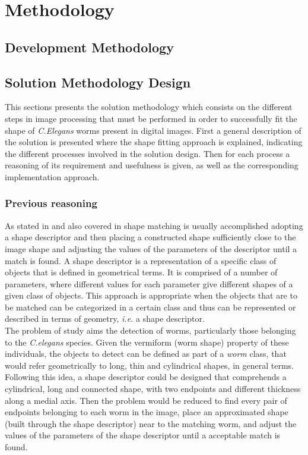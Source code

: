 \cleardoublepage  
\chapter{Methodology}
\label{chap:methodology}

\section{Development Methodology}
\label{sec:devmet}

\section{Solution Methodology Design}
\label{sec:solmet}

This sections presents the solution methodology which consists on the different
steps in image processing that must be performed in order to successfully fit the shape of 
\emph{C.Elegans} worms present in digital images. First a general description
of the solution is presented where the shape fitting approach is explained, indicating
the different processes involved in the solution design. Then for each process 
a reasoning of its requirement and usefulness is given, as well as 
the corresponding 
implementation approach.

\subsection{Previous reasoning}
\label{sec:reasoning}

As stated in \cite{binaryshape} and also covered in
\cite{deformable,matching2,matchingbook} shape 
matching is usually accomplished adopting a shape
descriptor and then placing a constructed shape sufficiently 
close to the image shape and adjusting the values of 
the parameters of the descriptor until a match is found.
A shape descriptor is a representation of a 
specific class of objects that is defined in geometrical
terms. It is comprised of a number of parameters, where 
different values for each parameter give different 
shapes of a given class of objects.
This approach is appropriate when the objects
that are to be matched can be categorized in a certain 
class and thus can be represented or described in terms
of geometry, \emph{i.e.} a shape descriptor.\\

The problem of study aims the detection of worms,
particularly those belonging to the \emph{C.elegans} species. Given
the vermiform (worm shape) property of these individuals,
the objects to detect can be defined as part of a 
\emph{worm} class,
that would refer geometrically to long, thin and cylindrical 
shapes, in 
general terms. Following this idea, a shape descriptor could be
designed that comprehends a cylindrical, long and connected
shape, with two endpoints and different thickness along a medial
axis. Then the problem would be reduced to find every pair of
endpoints belonging to each worm in the image, place an approximated
shape (built through the shape descriptor) near to the matching worm,
and adjust the values of the parameters of the shape descriptor until
a acceptable match is found.\\

